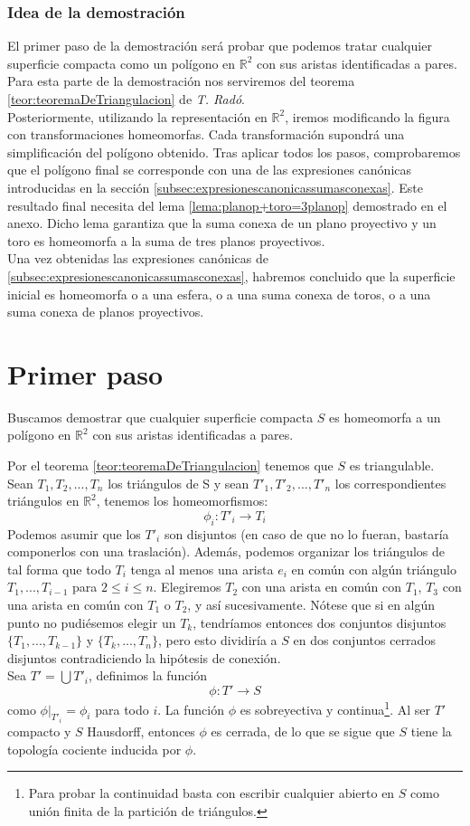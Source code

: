 \documentclass[a4paper,11pt,spanish, twoside, leqno]{tfg-uam}
\newcommand*{\reales}{\mathbb{R}}
\theoremstyle{definition}
\begin{document}
\subsubsection*{Idea de la demostración}
El primer paso de la demostración será probar que podemos tratar cualquier superficie compacta como un polígono en $\reales^2$ con sus aristas identificadas a pares. Para esta parte de la demostración nos serviremos del teorema \ref{teor:teoremaDeTriangulacion} de \textit{T. Radó}.\\
Posteriormente, utilizando la representación en $\reales^2$, iremos modificando la figura con transformaciones homeomorfas. Cada transformación supondrá una simplificación del polígono obtenido. Tras aplicar todos los pasos, comprobaremos que el polígono final se corresponde con una de las expresiones canónicas introducidas en la sección \ref{subsec:expresionescanonicassumasconexas}. Este resultado final necesita del lema \ref{lema:planop+toro=3planop} demostrado en el anexo. Dicho lema garantiza que la suma conexa de un plano proyectivo y un toro es homeomorfa a la suma de tres planos proyectivos.\\
Una vez obtenidas las expresiones canónicas de \ref{subsec:expresionescanonicassumasconexas}, habremos concluido que la superficie inicial es homeomorfa o a una esfera, o a una suma conexa de toros, o a una suma conexa de planos proyectivos.\\

\section{Primer paso}
Buscamos demostrar que cualquier superficie compacta $S$ es homeomorfa a un polígono en $\reales^2$ con sus aristas identificadas a pares.

Por el teorema \ref{teor:teoremaDeTriangulacion} tenemos que $S$ es triangulable. Sean $T_1, T_2, ..., T_n$ los triángulos de S y sean $T'_1, T'_2, ...,  T'_n$ los correspondientes triángulos en $\reales^2$, tenemos los homeomorfismos:
\[ \phi_i: T'_i \longrightarrow T_i \]
Podemos asumir que los $T'_i$ son disjuntos (en caso de que no lo fueran, bastaría componerlos con una traslación). Además, podemos organizar los triángulos de tal forma que todo $T_i$ tenga al menos una arista $e_i$ en común con algún triángulo $T_1, ..., T_{i-1}$ para $2\leq i \leq n$. Elegiremos $T_2$ con una arista en común con $T_1$, $T_3$ con una arista en común con $T_1$ o $T_2$, y así sucesivamente. Nótese que si en algún punto no pudiésemos elegir un $T_k$, tendríamos entonces dos conjuntos disjuntos $\{T_1, ..., T_{k-1} \}$ y $\{T_k, ..., T_n\}$, pero esto dividiría a $S$ en dos conjuntos cerrados disjuntos contradiciendo la hipótesis de conexión.\\
Sea $T' = \bigcup T'_i$, definimos la función 
\[ \phi: T' \longrightarrow S \]
como $\phi |_{T'_i} = \phi_i$ para todo $i$. La función $\phi$ es sobreyectiva y continua\footnote{Para probar la continuidad basta con escribir cualquier abierto en $S$ como unión finita de la partición de triángulos.}. Al ser $T'$ compacto y $S$ Hausdorff, entonces $\phi$ es cerrada, de lo que se sigue que $S$ tiene la topología cociente inducida por $\phi$.
\end{document}
